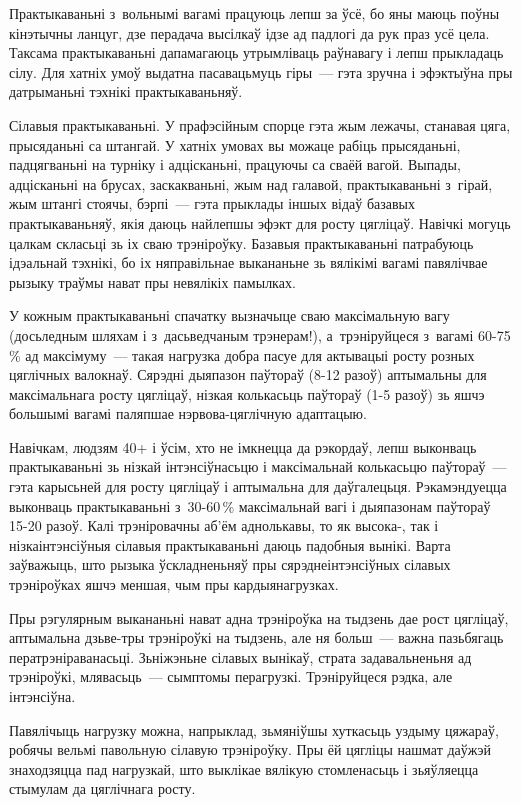 Практыкаваньні з~вольнымі вагамі працуюць лепш за ўсё, бо яны маюць поўны кінэтычны ланцуг, дзе перадача высілкаў ідзе ад падлогі да рук праз усё цела. Таксама практыкаваньні дапамагаюць утрымліваць раўнавагу і лепш прыкладаць сілу. Для хатніх умоў выдатна пасавацьмуць гіры~--- гэта зручна і эфэктыўна пры датрыманьні тэхнікі практыкаваньняў.

Сілавыя практыкаваньні. У прафэсійным спорце гэта жым лежачы, станавая цяга, прысяданьні са штангай. У хатніх умовах вы можаце рабіць прысяданьні, падцягваньні на турніку і адцісканьні, працуючы са сваёй вагой. Выпады, адцісканьні на брусах, заскакваньні, жым над галавой, практыкаваньні з~гірай, жым штангі стоячы, бэрпі~--- гэта прыклады іншых відаў базавых практыкаваньняў, якія даюць найлепшы эфэкт для росту цягліцаў. Навічкі могуць цалкам скласьці зь іх сваю трэніроўку. Базавыя практыкаваньні патрабуюць ідэальнай тэхнікі, бо іх няправільнае выкананьне зь вялікімі вагамі павялічвае рызыку траўмы нават пры невялікіх памылках.

У кожным практыкаваньні спачатку вызначыце сваю максімальную вагу (досьледным шляхам і з~дасьведчаным трэнерам!), а~трэніруйцеся з~вагамі 60-75\,\% ад максімуму~--- такая нагрузка добра пасуе для актывацыі росту розных цяглічных валокнаў. Сярэдні дыяпазон паўтораў (8-12 разоў) аптымальны для максімальнага росту цягліцаў, нізкая колькасьць паўтораў (1-5 разоў) зь яшчэ большымі вагамі паляпшае нэрвова-цяглічную адаптацыю.

Навічкам, людзям 40+ і ўсім, хто не імкнецца да рэкордаў, лепш выконваць практыкаваньні зь нізкай інтэнсіўнасьцю і максімальнай колькасьцю паўтораў~--- гэта карысьней для росту цягліцаў і аптымальна для даўгалецьця. Рэкамэндуецца выконваць практыкаваньні з~30-60\,\% максімальнай вагі і дыяпазонам паўтораў 15-20 разоў. Калі трэніровачны аб'ём аднолькавы, то як высока-, так і нізкаінтэнсіўныя сілавыя практыкаваньні даюць падобныя вынікі. Варта заўважыць, што рызыка ўскладненьняў пры сярэднеінтэнсіўных сілавых трэніроўках яшчэ меншая, чым пры кардыянагрузках.

Пры рэгулярным выкананьні нават адна трэніроўка на тыдзень дае рост цягліцаў, аптымальна дзьве-тры трэніроўкі на тыдзень, але ня больш~--- важна пазьбягаць ператрэніраванасьці. Зьніжэньне сілавых вынікаў, страта задавальненьня ад трэніроўкі, млявасьць~--- сымптомы перагрузкі. Трэніруйцеся рэдка, але інтэнсіўна.

Павялічыць нагрузку можна, напрыклад, зьмяніўшы хуткасьць уздыму цяжараў, робячы вельмі павольную сілавую трэніроўку. Пры ёй цягліцы нашмат даўжэй знаходзяцца пад нагрузкай, што выклікае вялікую стомленасьць і зьяўляецца стымулам да цяглічнага росту.

